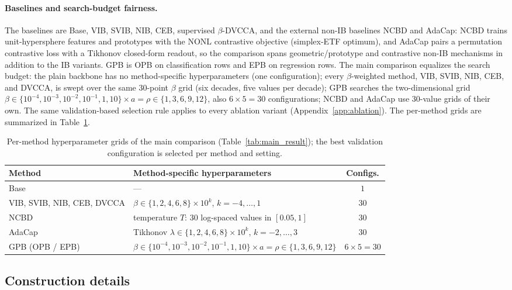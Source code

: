 \paragraph{Baselines and search-budget fairness.} The baselines are Base, VIB, SVIB,
NIB, CEB, supervised $\beta$-DVCCA, and the external non-IB baselines
NCBD and AdaCap: NCBD trains unit-hypersphere features and prototypes
with the NONL contrastive objective (simplex-ETF optimum), and AdaCap
pairs a permutation contrastive loss with a Tikhonov closed-form readout,
so the comparison spans geometric/prototype and contrastive non-IB
mechanisms in addition to the IB variants. GPB is OPB on classification
rows and EPB on regression rows. The main
comparison equalizes the search budget: the plain backbone has no
method-specific hyperparameters (one configuration); every
$\beta$-weighted method, VIB, SVIB, NIB, CEB, and DVCCA, is swept over
the same 30-point $\beta$ grid (six decades, five values per decade);
GPB searches the two-dimensional grid
$\beta\in\{10^{-4},10^{-3},10^{-2},10^{-1},1,10\}\times
a=\rho\in\{1,3,6,9,12\}$, also $6\times5=30$ configurations; NCBD and
AdaCap use 30-value grids of their own. The same validation-based
selection rule applies to every ablation variant
(Appendix~\ref{app:ablation}). The per-method
grids are summarized in Table~\ref{tab:search-protocol}.

\begin{table}[t]
\centering\small
\setlength{\tabcolsep}{3pt}
\caption{Per-method hyperparameter grids of the main comparison
(Table~\ref{tab:main_result}); the best validation configuration is
selected per method and setting.}
\label{tab:search-protocol}
\begin{tabular}{l l c}
\hline
Method & Method-specific hyperparameters & Configs. \\
\hline
Base & --- & $1$ \\
VIB, SVIB, NIB, CEB, DVCCA & $\beta\in\{1,2,4,6,8\}\times10^{k}$, $k=-4,\dots,1$ & $30$ \\
NCBD & temperature $T$: 30 log-spaced values in $[0.05,1]$ & $30$ \\
AdaCap & Tikhonov $\lambda\in\{1,2,4,6,8\}\times10^{k}$, $k=-2,\dots,3$ & $30$ \\
GPB (OPB / EPB) & $\beta\in\{10^{-4},10^{-3},10^{-2},10^{-1},1,10\}\times a=\rho\in\{1,3,6,9,12\}$ & $6\times5=30$ \\
\hline
\end{tabular}
\end{table}
\subsection{Construction details}
\label{app:construction}

